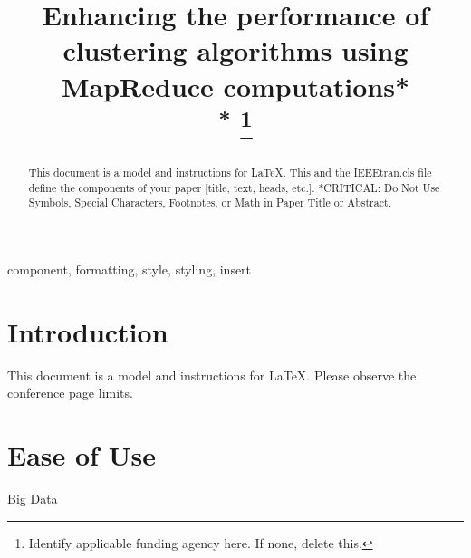 \documentclass[conference]{IEEEtran}
\begin{document}
\title{Enhancing the performance of clustering algorithms using MapReduce computations*\\
{\footnotesize \textsuperscript{*}}
\thanks{Identify applicable funding agency here. If none, delete this.}
}


\author{\IEEEauthorblockN{}

\and


}


\maketitle

\begin{abstract}
This document is a model and instructions for \LaTeX.
This and the IEEEtran.cls file define the components of your paper [title, text, heads, etc.]. *CRITICAL: Do Not Use Symbols, Special Characters, Footnotes, 
or Math in Paper Title or Abstract.
\end{abstract}

\begin{IEEEkeywords}
component, formatting, style, styling, insert
\end{IEEEkeywords}

\section{Introduction}
This document is a model and instructions for \LaTeX.
Please observe the conference page limits. 

\section{Ease of Use}

Big Data\\
\end{document}
